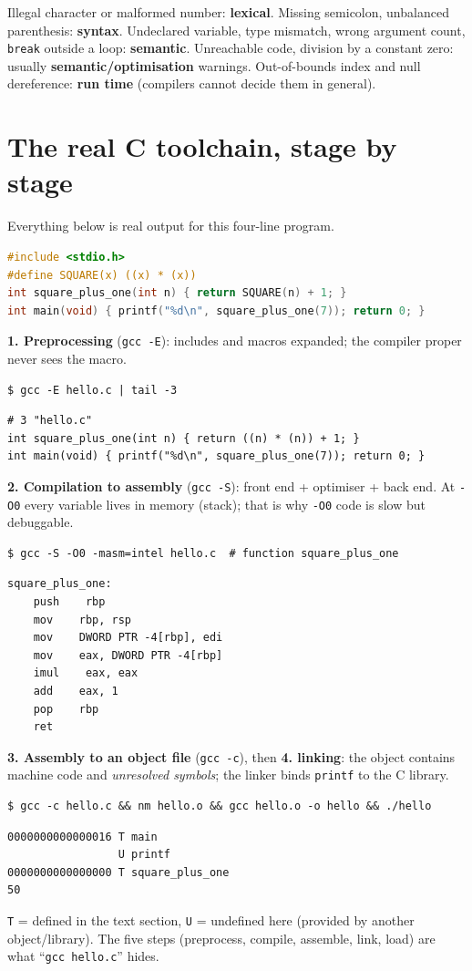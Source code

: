 \documentclass[10pt,a4paper,openany,oneside]{report}
\newcommand{\prio}[1]{\texorpdfstring{\ifcase#1\or{\color{gold}\ding{72}}\or{\color{gold}\ding{72}\ding{72}}\or{\color{gold}\ding{72}\ding{72}\ding{72}}\fi}{}}
\begin{document}
\begin{tipbox}
Illegal character or malformed number: \textbf{lexical}. Missing semicolon, unbalanced parenthesis: \textbf{syntax}. Undeclared variable, type mismatch, wrong argument count, \texttt{break} outside a loop: \textbf{semantic}. Unreachable code, division by a constant zero: usually \textbf{semantic/optimisation} warnings. Out-of-bounds index and null dereference: \textbf{run time} (compilers cannot decide them in general).
\end{tipbox}

\section{The real C toolchain, stage by stage \prio{3}}
Everything below is real output for this four-line program.
\begin{lstlisting}[language={C}]
#include <stdio.h>
#define SQUARE(x) ((x) * (x))
int square_plus_one(int n) { return SQUARE(n) + 1; }
int main(void) { printf("%d\n", square_plus_one(7)); return 0; }
\end{lstlisting}
\textbf{1. Preprocessing} (\texttt{gcc -E}): includes and macros expanded; the compiler proper never sees the macro.
\begin{lstlisting}[style=shcmd]
$ gcc -E hello.c | tail -3
\end{lstlisting}
\begin{lstlisting}[style=out]
# 3 "hello.c"
int square_plus_one(int n) { return ((n) * (n)) + 1; }
int main(void) { printf("%d\n", square_plus_one(7)); return 0; }
\end{lstlisting}
\textbf{2. Compilation to assembly} (\texttt{gcc -S}): front end + optimiser + back end. At \texttt{-O0} every variable lives in memory (stack); that is why \texttt{-O0} code is slow but debuggable.
\begin{lstlisting}[style=shcmd]
$ gcc -S -O0 -masm=intel hello.c  # function square_plus_one
\end{lstlisting}
\begin{lstlisting}[style=out]
square_plus_one:
    push    rbp
    mov    rbp, rsp
    mov    DWORD PTR -4[rbp], edi
    mov    eax, DWORD PTR -4[rbp]
    imul    eax, eax
    add    eax, 1
    pop    rbp
    ret
\end{lstlisting}
\textbf{3. Assembly to an object file} (\texttt{gcc -c}), then \textbf{4. linking}: the object contains machine code and \emph{unresolved symbols}; the linker binds \texttt{printf} to the C library.
\begin{lstlisting}[style=shcmd]
$ gcc -c hello.c && nm hello.o && gcc hello.o -o hello && ./hello
\end{lstlisting}
\begin{lstlisting}[style=out]
0000000000000016 T main
                 U printf
0000000000000000 T square_plus_one
50
\end{lstlisting}
\texttt{T} = defined in the text section, \texttt{U} = undefined here (provided by another object/library). The five steps (preprocess, compile, assemble, link, load) are what ``\texttt{gcc hello.c}'' hides.
\end{document}

